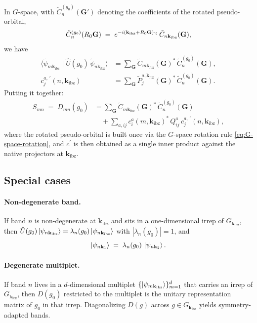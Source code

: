 \documentclass[11pt,a4paper]{article}
\newcommand{\kk}{\mathbf{k}}
\newcommand{\GG}{\mathbf{G}}
\newcommand{\kibz}{\kk_{\text{ibz}}}
\newcommand{\Uhat}{\hat{U}}
\begin{document}
In $G$-space, with $\tilde C^{(g_0)}_{n}(\GG')$ denoting the coefficients of
the rotated pseudo-orbital,
\begin{equation}
\tilde C^{(g_0)}_{n}(R_0\GG)
  \;=\; e^{-i(\kibz + R_0\GG)\cdot\tt_0}\,\tilde C_{n\kibz}(\GG),
\end{equation}
we have
\begin{align}
\langle\tilde\psi_{m\kibz}\mid\Uhat(g_0)\,\tilde\psi_{n\kibz}\rangle
  &= \sum_{\GG} \tilde C_{m\kibz}(\GG)^*\,\tilde C^{(g_0)}_{n}(\GG), \\
c_j^{a,\,\prime}(n,\kibz)
  &= \sum_{\GG} \tilde P_j^{a,\kibz}(\GG)^*\,\tilde C^{(g_0)}_{n}(\GG).
\end{align}
Putting it together:
\begin{equation}
\boxed{\;
\begin{aligned}
S_{mn} \;=\; D_{mn}(g_0)
  &= \sum_{\GG} \tilde C_{m\kibz}(\GG)^*\,\tilde C^{(g_0)}_{n}(\GG) \\
  &\quad + \sum_{a,ij} c_i^a(m,\kibz)^*\,Q^a_{ij}\,c_j^{a,\,\prime}(n,\kibz),
\end{aligned}
\;}
\label{eq:S-final}
\end{equation}
where the rotated pseudo-orbital is built once via the $G$-space rotation
rule \eqref{eq:G-space-rotation}, and $c^{\prime}$ is then obtained as a
single inner product against the native projectors at $\kibz$.

\subsection{Special cases}

\paragraph{Non-degenerate band.} If band $n$ is non-degenerate at $\kibz$ and
sits in a one-dimensional irrep of $G_{\kk_{\mathrm{ibz}}}$, then
$\Uhat(g_0)\ket{\psi_{n\kibz}} = \lambda_n(g_0)\ket{\psi_{n\kibz}}$ with
$|\lambda_n(g_0)|=1$, and
\begin{equation}
\ket{\psi_{n\kk_1}} \;=\; \lambda_n(g_0)\,\ket{\psi_{n\kk_2}}.
\end{equation}

\paragraph{Degenerate multiplet.} If band $n$ lives in a $d$-dimensional
multiplet $\{\ket{\psi_{m\kibz}}\}_{m=1}^{d}$ that carries an irrep of
$G_{\kk_{\mathrm{ibz}}}$, then $D(g_0)$ restricted to the multiplet is the unitary
representation matrix of $g_0$ in that irrep. Diagonalizing $D(g)$ across
$g\in G_{\kk_{\mathrm{ibz}}}$ yields symmetry-adapted bands.
\end{document}
